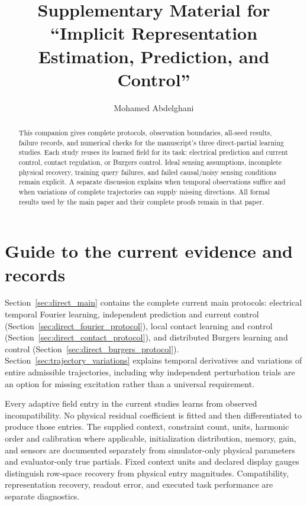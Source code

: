 \documentclass[journal]{IEEEtran}
\begin{document}
\title{Supplementary Material for\\``Implicit Representation Estimation, Prediction, and Control''}
\author{Mohamed Abdelghani}
\maketitle
\raggedbottom
\begin{abstract}
This companion gives complete protocols, observation boundaries, all-seed
results, failure records, and numerical checks for the manuscript's three
direct-partial learning studies. Each study reuses its learned field for its
task: electrical prediction and current control, contact regulation, or Burgers
control. Ideal sensing assumptions, incomplete
physical recovery, training query failures, and failed causal/noisy sensing
conditions remain explicit. A separate discussion explains when temporal
observations suffice and when variations of complete trajectories can supply
missing directions. All formal results
used by the main paper and their complete proofs remain in that paper.
\end{abstract}

\section{Guide to the current evidence and records}
\label{sec:scope}
Section~\ref{sec:direct_main} contains the complete current main protocols:
electrical temporal Fourier learning, independent prediction and current control
(Section~\ref{sec:direct_fourier_protocol}), local contact learning and control
(Section~\ref{sec:direct_contact_protocol}), and distributed Burgers learning
and control (Section~\ref{sec:direct_burgers_protocol}).
Section~\ref{sec:trajectory_variations} explains temporal derivatives and
variations of entire admissible trajectories, including why independent
perturbation trials are an option for missing excitation rather than a
universal requirement.

Every adaptive field entry in the current studies learns from observed
incompatibility. No physical residual coefficient is fitted and then
differentiated to produce those entries. The supplied context, constraint
count, units, harmonic order and calibration where applicable, initialization distribution,
memory, gain, and sensors are documented separately from simulator-only
physical parameters and evaluator-only true partials. Fixed context units
and declared display gauges distinguish row-space recovery from physical
entry magnitudes. Compatibility, representation recovery, readout error,
and executed task performance are separate diagnostics.
\end{document}
